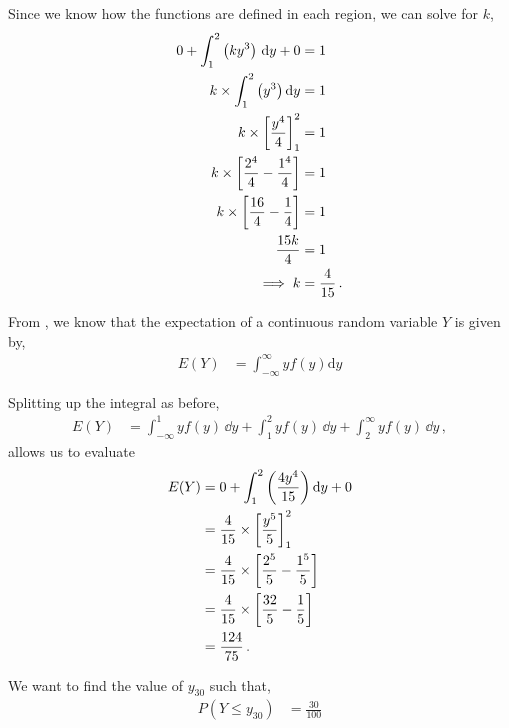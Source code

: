 \begin{subquestions}
\begin{subsubquestions}
Since we know how the functions are defined in each region, we can solve for $k$,
\begin{align}
	0 + \int_{1}^{2} \left(ky^3\right)\, \mathrm{d} y + 0 & = 1 \nonumber \\
	k \times \int_{1}^{2} \left(y^3\right)\mathrm{d}y & = 1 \nonumber \\
	k \times \left[\frac{y^4}{4} \right]^2_1 & = 1 \nonumber \\
	k \times \left[\frac{2^4}{4} - \frac{1^4}{4}\right] & = 1 \nonumber \\
	k \times \left[\frac{16}{4}- \frac{1}{4}\right] & = 1 \nonumber \\
	\frac{15k}{4} & = 1 \nonumber \\
	\implies k & = \frac{4}{15} \,.
\end{align}
	

\subquestion

From , we know that the expectation of a continuous random variable $Y$ is given by,
\begin{align}
	E(Y) & = \int_{-\infty}^{\infty}y f(y)\mathrm{d}y 
\end{align}

Splitting up the integral as before,
\begin{align}
E(Y)	& = \int_{-\infty}^{1}y f(y)\, \dd y + \int_{1}^{2}y f(y)\, \dd y + \int_{2}^{\infty}y f(y)\, \dd y \,,
\end{align}
allows us to evaluate
\begin{align}
E(Y) 	& = 0 + \int_{1}^{2} \left( \frac{4y^4}{15}\right)\mathrm{d}y + 0 \nonumber \\
		& = \frac{4}{15} \times \left[\frac{y^5}{5} \right]^2_1 \nonumber \\
	   & = \frac{4}{15} \times \left[\frac{2^5}{5} -\frac{1^5}{5} \right] \nonumber \\
	   & = \frac{4}{15} \times \left[\frac{32}{5} -\frac{1}{5} \right] \nonumber \\
	   & = \frac{124}{75} \,. 
\end{align}


\subquestion
We want to find the value of $y_{30}$ such that,
\begin{align}
	P(Y \leq y_{30}) &= \frac{30}{100}
\end{align}


\end{subsubquestions}
\end{subquestions}
